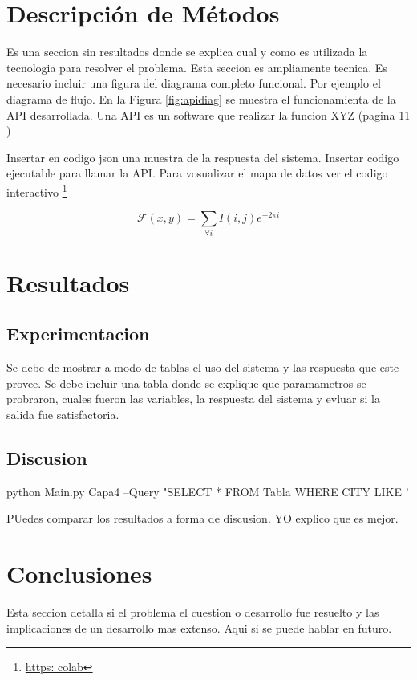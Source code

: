 \documentclass{imsart}
\begin{document}
\newpage

\section{Descripción de Métodos}

Es una seccion sin resultados donde se explica cual y como es utilizada la tecnologia para resolver el problema. Esta seccion es ampliamente tecnica. Es necesario incluir una figura del diagrama completo funcional. Por ejemplo el diagrama de flujo. En la Figura \ref{fig:apidiag} se muestra el funcionamienta de la \acrshort{API} desarrollada. Una API es un software que realizar la funcion XYZ (pagina 11 )\cite{preibisch2018api}



Insertar en codigo json una muestra de la respuesta del sistema. Insertar codigo ejecutable para llamar la API. Para vosualizar el mapa de datos ver el codigo interactivo \footnote{\url{https: colab}}

\begin{equation}
    \mathcal{F}(x,y) = \sum_{\forall i} I(i,j) e^{-2\pi i}
\end{equation}


\section{Resultados}

\subsection{Experimentacion}

Se debe de mostrar a modo de tablas el uso del sistema y las respuesta que este provee. Se debe incluir una tabla donde se explique que paramametros se probraron, cuales fueron las variables, la respuesta del sistema y evluar si la salida fue satisfactoria.

\subsection{Discusion}

\begin{bashbox}
python Main.py Capa4 --Query "SELECT * FROM Tabla WHERE CITY LIKE '%
\end{bashbox}

PUedes comparar los resultados a forma de discusion. YO explico que es mejor.

\section{Conclusiones}

Esta seccion detalla si el problema el cuestion o desarrollo fue resuelto y las implicaciones de un desarrollo mas extenso. Aqui si se puede hablar en futuro. 


\newpage

\printglossaries

{\small


}
\end{document}
